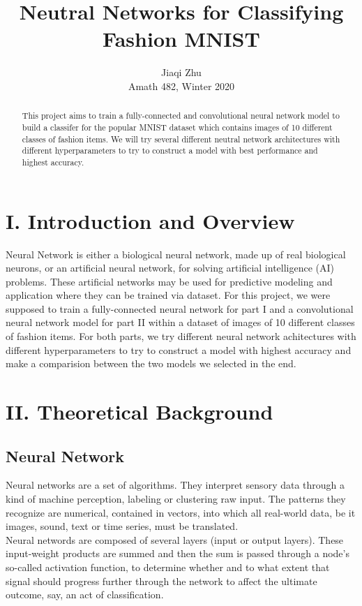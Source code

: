 \documentclass[12pt,letterpaper]{article}
\author{Jiaqi Zhu \\Amath 482, Winter 2020}
\title{Neutral Networks for Classifying Fashion MNIST}
\begin{document}
\maketitle
\begin{abstract}
This project aims to train a fully-connected and convolutional neural network model to build a classifer for the popular MNIST dataset which contains images of 10 different classes of fashion items. We will try several different neutral network architectures with different hyperparameters to try to construct a model with best performance and highest accuracy.  
\end{abstract}

\section*{I. Introduction and Overview}
Neural Network is either a biological neural network, made up of real biological neurons, or an artificial neural network, for solving artificial intelligence (AI) problems. These artificial networks may be used for predictive modeling and application where they can be trained via dataset. For this project, we were supposed to train a fully-connected neural network for part I and a convolutional neural network model for part II within a dataset of images of 10 different classes of fashion items. For both parts, we try different neural network achitectures with different hyperparameters to try to construct a model with highest accuracy and make a comparision between the two models we selected in the end. 

\section*{II. Theoretical Background}
\subsection*{Neural Network}
Neural networks are a set of algorithms. They interpret sensory data through a kind of machine perception, labeling or clustering raw input. The patterns they recognize are numerical, contained in vectors, into which all real-world data, be it images, sound, text or time series, must be translated.
\\Neural networds are composed of several layers (input or output layers). These input-weight products are summed and then the sum is passed through a node’s so-called activation function, to determine whether and to what extent that signal should progress further through the network to affect the ultimate outcome, say, an act of classification.
\end{document}
